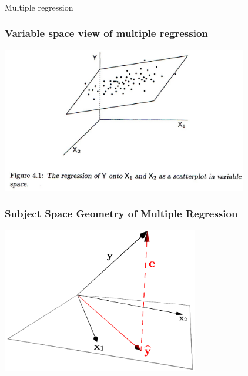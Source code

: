 \documentclass{beamer}
\begin{document}
\begin{frame}
  \frametitle{}
\begin{center}
\begin{Huge}
{\rmfamily Multiple regression}
\end{Huge}
\end{center}
\end{frame}


\begin{frame}[fragile]
  \frametitle{Variable space view of multiple regression}

\begin{center}
\includegraphics[height=2.5in]{fig-regression-variable-space.pdf}
\end{center}


\end{frame}


\begin{frame}
  \frametitle{Subject Space Geometry of Multiple Regression}

\begin{center}
\includegraphics[height=2.5in]{fig-multiregr.pdf}

\end{center}
\end{frame}
\end{document}
